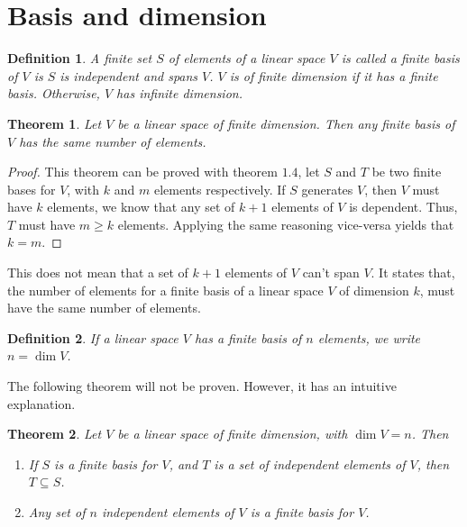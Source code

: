 \documentclass{book}
\newtheorem{theorem}{Theorem}[chapter]
\newtheorem{definition}{Definition}[chapter]
\begin{document}
\section{Basis and dimension}
\begin{definition}
    A finite set $S$ of elements of a linear space $V$ is called a \textit{finite basis} of $V$ is $S$ is independent and spans $V$.
    $V$ is of finite dimension if it has a finite basis. Otherwise, $V$ has infinite dimension.
\end{definition}

\begin{theorem}
    Let $V$ be a linear space of finite dimension. Then any finite basis of $V$ has the same number of elements.
\end{theorem}

\begin{proof}
    This theorem can be proved with theorem $1.4$, let $S$ and $T$ be two finite bases for $V$, with $k$ and $m$ elements respectively.
    If $S$ generates $V$, then $V$ must have $k$ elements, we know that any set of $k+1$ elements of $V$ is dependent. Thus, $T$ must have
    $m\geq k$ elements. Applying the same reasoning vice-versa yields that $k=m$.
\end{proof}

This does not mean that a set of $k+1$ elements of $V$ can't span $V$. It
states that, the number of elements for a finite basis of a linear space $V$ of
dimension $k$, must have the same number of elements.

\begin{definition}
    If a linear space $V$ has a finite basis of $n$ elements, we write $n=\dim V$.
\end{definition}

The following theorem will not be proven. However, it has an intuitive
explanation.

\begin{theorem}
    Let $V$ be a linear space of finite dimension, with $\dim V = n$. Then

    \begin{enumerate}
        \item If $S$ is a finite basis for $V$, and $T$ is a set of independent elements of
              $V$, then $T\subseteq S$.
        \item Any set of $n$ independent elements of $V$ is a finite basis for $V$.
    \end{enumerate}

\end{theorem}
\end{document}
